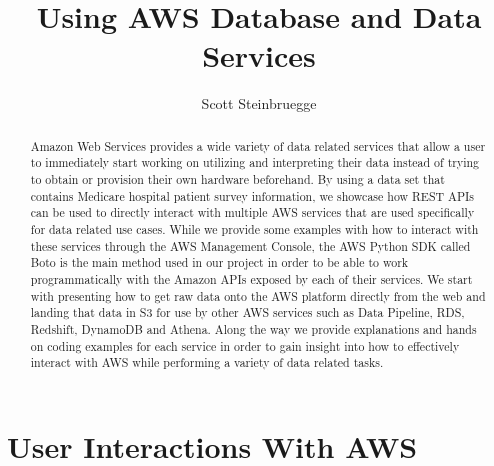 
\title{Using AWS Database and Data Services}

\author{Scott Steinbruegge}

\renewcommand{\shortauthors}{S. Steinbruegge}

\begin{abstract}
Amazon Web Services provides a wide variety of data related services that 
allow a user to immediately start working on utilizing and interpreting their 
data instead of trying to obtain or provision their own hardware beforehand. 
By using a data set that contains Medicare hospital patient survey 
information, we showcase how REST APIs can be used to directly interact with 
multiple AWS services that are used specifically for data related use cases. 
While we provide some examples with how to interact with these services 
through the AWS Management Console, the AWS Python SDK called Boto is the main 
method used in our project in order to be able to work programmatically with 
the Amazon APIs exposed by each of their services. We start with presenting 
how to get raw data onto the AWS platform directly from the web and landing 
that data in S3 for use by other AWS services such as Data Pipeline, RDS, 
Redshift, DynamoDB and Athena. Along the way we provide explanations and hands 
on coding examples for each service in order to gain insight into how to 
effectively interact with AWS while performing a variety of data related tasks. 
\end{abstract}


\maketitle

\section{User Interactions With AWS}

